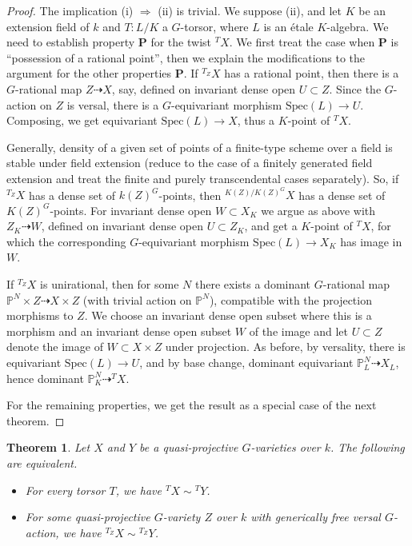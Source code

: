 \documentclass[12pt, reqno]{amsart}
\numberwithin{equation}{section}
\theoremstyle{plain}
\newtheorem{theo}[prop]{Theorem}
\theoremstyle{definition}
\def\bP{{\mathbb P}}
\def\Spec{\mathrm{Spec}}
\begin{document}
\begin{proof}
The implication (i) $\Rightarrow$ (ii) is trivial.
We suppose (ii), and let
$K$ be an extension field of $k$ and
$T\colon L/K$ a $G$-torsor, where
$L$ is an \'etale $K$-algebra.
We need to establish property $\mathbf{P}$
for the twist ${}^TX$.
We first treat the case when $\mathbf{P}$ is ``possession of a rational point'', then we explain the modifications to the argument for
the other properties $\mathbf{P}$.
If ${}^{T_Z}X$ has a rational point, then there is a $G$-rational map $Z\dashrightarrow X$, say, defined on
invariant dense open $U\subset Z$.
Since the $G$-action on $Z$ is versal, there is a $G$-equivariant morphism $\Spec(L)\to U$.
Composing, we get equivariant $\Spec(L)\to X$, thus a $K$-point of ${}^TX$.

Generally, density of a given set of points of a finite-type scheme over a field is stable under field extension (reduce to the case of a finitely generated field extension and treat the finite and purely transcendental cases separately).
So, if ${}^{T_Z}X$ has a dense set of $k(Z)^G$-points, then
${}^{K(Z)/K(Z)^G}X$ has a dense set of $K(Z)^G$-points.
For invariant dense open $W\subset X_K$ we argue as above with $Z_K\dashrightarrow W$, defined on invariant dense open $U\subset Z_K$, and get a $K$-point of ${}^TX$, for which the corresponding $G$-equivariant morphism $\Spec(L)\to X_K$ has image in $W$.

If ${}^{T_Z}X$ is unirational, then for some $N$ there exists a dominant $G$-rational map $\bP^N\times Z\dashrightarrow X\times Z$ (with trivial action on $\bP^N$), compatible with the projection morphisms to $Z$.
We choose an invariant dense open subset where this is a morphism and an invariant dense open subset $W$ of the image and let $U\subset Z$ denote the image of $W\subset X\times Z$ under projection.
As before, by versality, there is equivariant $\Spec(L)\to U$, and by base change, dominant equivariant $\bP^N_L\dashrightarrow X_L$, hence dominant $\bP^N_K\dashrightarrow {}^TX$.

For the remaining properties, we get the result as a special case of the next theorem.
\end{proof}

\begin{theo}
\label{thm.onetorsorXY}
Let $X$ and $Y$ be a quasi-projective $G$-varieties over $k$.
The following are equivalent.
\begin{itemize}
\item[(i)] For every torsor $T$, we have
${}^TX\sim {}^TY$.
\item[(ii)] For some quasi-projective $G$-variety $Z$ over $k$ with generically free versal $G$-action, we have ${}^{T_Z}X\sim {}^{T_Z}Y$.
\end{itemize}
\end{theo}
\end{document}

